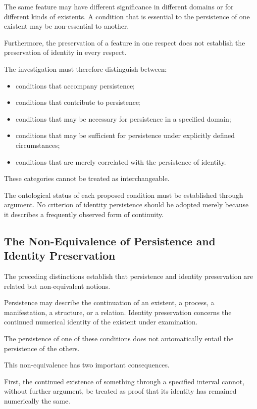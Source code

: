 The same feature may have different significance
in different domains or for different kinds of existents.
A condition that is essential to the persistence of
one existent may be non-essential to another.

Furthermore, the preservation of a feature in one
respect does not establish the preservation of identity
in every respect.

The investigation must therefore distinguish between:

\begin{itemize}
    \item conditions that accompany persistence;
    \item conditions that contribute to persistence;
    \item conditions that may be necessary for persistence
    in a specified domain;
    \item conditions that may be sufficient for persistence
    under explicitly defined circumstances;
    \item conditions that are merely correlated with
    the persistence of identity.
\end{itemize}

These categories cannot be treated as interchangeable.

The ontological status of each proposed condition must
be established through argument. No criterion of identity
persistence should be adopted merely because it describes
a frequently observed form of continuity.

\subsection{The Non-Equivalence of Persistence and Identity Preservation}

The preceding distinctions establish that persistence
and identity preservation are related but non-equivalent
notions.

Persistence may describe the continuation of an existent,
a process, a manifestation, a structure, or a relation.
Identity preservation concerns the continued numerical
identity of the existent under examination.

The persistence of one of these conditions does not
automatically entail the persistence of the others.

This non-equivalence has two important consequences.

First, the continued existence of something through
a specified interval cannot, without further argument,
be treated as proof that its identity has remained
numerically the same.

